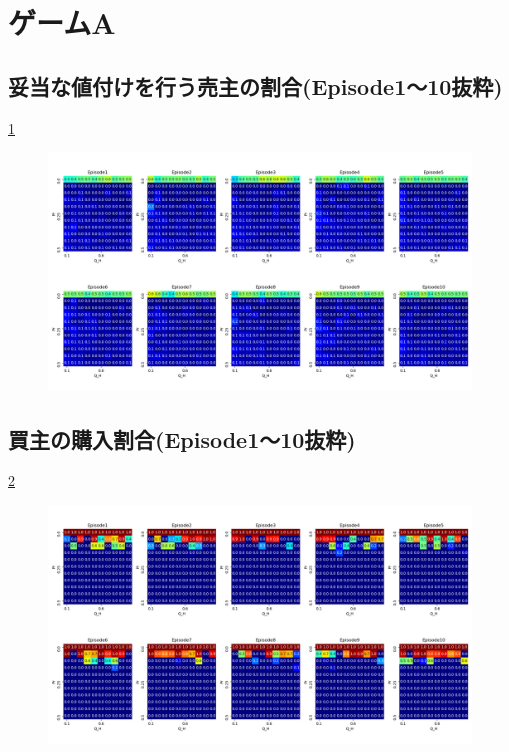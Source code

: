 \documentclass[a4paper,fontsize=11pt,report,notitlepage,line_length=38zw,number_of_lines=40,dvipdfmx]{jlreq}
\begin{document}
\section{ゲームA}
\begin{landscape}
\subsection{妥当な値付けを行う売主の割合(Episode1〜10抜粋)}
\ref{Honest_Seller_gameA}
\begin{figure}
 \centering
 \includegraphics[width=18cm]{Honest_Seller_gameA.png}
 \caption{}
 \label{Honest_Seller_gameA}
\end{figure}
\end{landscape}
\newpage
\begin{landscape}
\subsection{買主の購入割合(Episode1〜10抜粋)}
\ref{Trading_gameA}
\begin{figure}
 \centering
 \includegraphics[width=18cm]{Trading_gameA.png}
 \caption{}
 \label{Trading_gameA}
\end{figure}
\end{landscape}
\newpage
\end{document}
